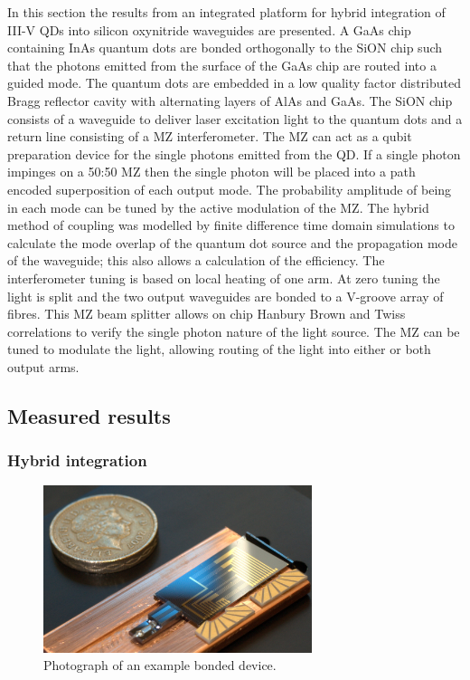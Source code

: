 In this section the results from an integrated platform for hybrid integration
of III-V QDs into silicon oxynitride waveguides are presented. A GaAs chip
containing InAs quantum dots are bonded orthogonally to the SiON chip such that
the photons emitted from the surface of the GaAs chip are routed into a guided
mode. The quantum dots are embedded in a low quality factor distributed Bragg
reflector cavity with alternating layers of AlAs and GaAs. The SiON chip
consists of a waveguide to deliver laser excitation light to the quantum dots
and a return line consisting of a MZ interferometer. The MZ can act as a qubit
preparation device for the single photons emitted from the QD. If a single
photon impinges on a 50:50 MZ then the single photon will be placed into a path
encoded superposition of each output mode. The probability amplitude of being in
each mode can be tuned by the active modulation of the MZ. The hybrid method of
coupling was modelled by finite difference time domain simulations to calculate
the mode overlap of the quantum dot source and the propagation mode of the
waveguide; this also allows a calculation of the efficiency. The interferometer
tuning is based on local heating of one arm. At zero tuning the light is split
and the two output waveguides are bonded to a V-groove array of fibres. This MZ
beam splitter allows on chip Hanbury Brown and Twiss correlations to verify the
single photon nature of the light source. The MZ can be tuned to modulate the
light, allowing routing of the light into either or both output arms.


\subsection{Measured results}

\subsubsection{Hybrid integration}

\begin{figure}[h!] \begin{center}
\includegraphics[width=0.7\textwidth]{images/h2.jpg} \caption{Photograph of an
example bonded device.} \label{fig:photo} \end{center} \end{figure}

